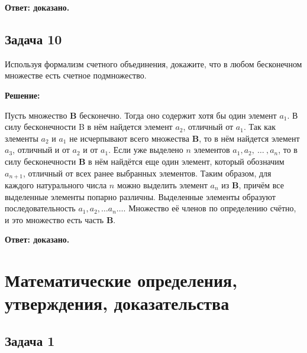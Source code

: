 \documentclass[a4paper,14pt]{article} %
\begin{document}
\begin{flushright}
\begin{large}
\textbf {Ответ: доказано.}
\end{large}
\end{flushright}

\begin{center}
\subsection{Задача 10}
\end{center}

Используя формализм счетного объединения, докажите, что в любом бесконечном множестве есть счетное подмножество.

\begin{center}
\bfseries
{\Large Решение: }
\end{center}


Пусть множество {\bf B} бесконечно. Тогда оно содержит хотя бы один элемент $a_{1}$. В силу бесконечности B в нём найдется элемент $a_{2}$, отличный от $a_{1}$. Так как злементы $a_{2}$ и $a_{1}$ не исчерпывают всего множества {\bf B}, то в нём найдется элемент $a_{3}$, отличный и от $a_{2}$ и от $a_{1}$. Если уже выделено $n$ элементов $a_{1}, a_{2},\ \dots\ , a_{n}$, то в силу бесконечности {\bf B} в нём найдётся еще один элемент, который обозначим $a_{n+1}$, отличный от всех ранее выбранных элементов. Таким образом, для каждого натурального числа $n$ можно выделить элемент $a_{n}$ из {\bf B}, причём все выделенные элементы попарно различны. Выделенные элементы образуют последовательность $ a_{1}, a_{2},\dots a_{n} \dots $. Множество её членов по определению счётно, и это множество есть часть {\bf B}.




\begin{flushright}
\begin{large}
\textbf {Ответ: доказано.}
\end{large}
\end{flushright}


\section{Математические определения, утверждения, доказательства}


\subsection{Задача 1}
\end{document}
